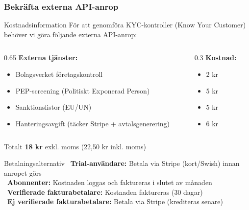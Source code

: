 \documentclass[10pt]{beamer}
\begin{document}
\begin{frame}[label=popup-kyc-kostnad]
  \frametitle{Bekräfta externa API-anrop}
  
  \vspace{0.3cm}
  
  \begin{alertblock}{Kostnadsinformation}
    För att genomföra KYC-kontroller (Know Your Customer) behöver vi göra följande externa API-anrop:
  \end{alertblock}
  
  \vspace{0.5cm}
  
  \begin{columns}[T]
    \begin{column}{0.65\textwidth}
      \textbf{Externa tjänster:}
      \begin{itemize}
        \item Bolagsverket företagskontroll
        \item PEP-screening (Politiskt Exponerad Person)
        \item Sanktionslistor (EU/UN)
        \item Hanteringsavgift (täcker Stripe + avtalsgenerering)
      \end{itemize}
    \end{column}
    \begin{column}{0.3\textwidth}
      \textbf{Kostnad:}
      \begin{itemize}
        \item 2 kr
        \item 5 kr
        \item 5 kr
        \item 6 kr
      \end{itemize}
    \end{column}
  \end{columns}
  
  \vspace{0.5cm}
  
  \begin{block}{Totalt}
    \Large\textbf{18 kr} exkl. moms (22,50 kr inkl. moms)
  \end{block}
  
  \vspace{0.5cm}
  
  \begin{alertblock}{Betalningsalternativ}
    \footnotesize
    \textbullet\ \textbf{Trial-användare:} Betala via Stripe (kort/Swish) innan anropet görs\\
    \textbullet\ \textbf{Abonnenter:} Kostnaden loggas och faktureras i slutet av månaden\\
    \textbullet\ \textbf{Verifierade fakturabetalare:} Kostnaden faktureras (30 dagar)\\
    \textbullet\ \textbf{Ej verifierade fakturabetalare:} Betala via Stripe (krediteras senare)
  \end{alertblock}
  

\end{frame}
\end{document}
